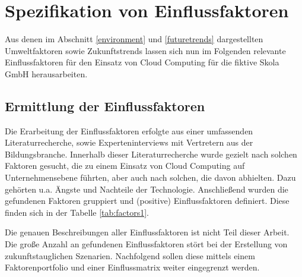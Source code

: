 \section{Spezifikation von Einflussfaktoren}
\label{influencingfactors}

Aus denen im Abschnitt \ref{environment} und \ref{futuretrends} dargestellten Umweltfaktoren sowie Zukunftstrends lassen sich nun im Folgenden relevante Einflussfaktoren für den Einsatz von Cloud Computing für die fiktive Skola GmbH herausarbeiten.

\subsection{Ermittlung der Einflussfaktoren}

Die Erarbeitung der Einflussfaktoren erfolgte aus einer umfassenden Literaturrecherche, sowie Experteninterviews mit Vertretern aus der Bildungsbranche. Innerhalb dieser Literaturrecherche wurde gezielt nach solchen Faktoren gesucht, die zu einem Einsatz von Cloud Computing auf Unternehmensebene führten, aber auch nach solchen, die davon abhielten. Dazu gehörten u.a. Ängste und Nachteile der Technologie. Anschließend wurden die gefundenen Faktoren gruppiert und (positive) Einflussfaktoren definiert. Diese finden sich in der Tabelle \ref{tab:factors1}.

Die genauen Beschreibungen aller Einflussfaktoren ist nicht Teil dieser Arbeit. Die große Anzahl an gefundenen Einflussfaktoren stört bei der Erstellung von zukunftstauglichen Szenarien. Nachfolgend sollen diese mittels einem Faktorenportfolio und einer Einflussmatrix weiter eingegrenzt werden.

